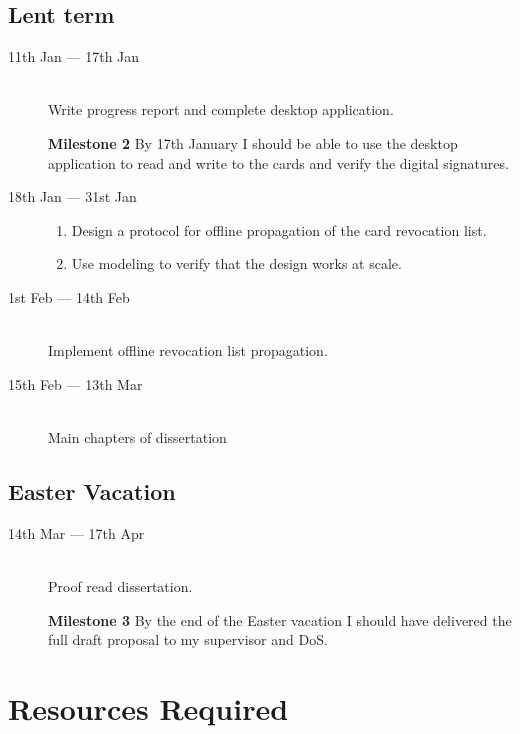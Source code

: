 \documentclass[a4paper, 12pt]{article}
\begin{document}
  \subsection*{Lent term}
  \begin{description}
    \item[11th Jan --- 17th Jan] \hfill \\
      Write progress report and complete desktop application.


      \textbf{Milestone 2}
      By 17th January I should be able to use the desktop application to read
      and write to the cards and verify the digital signatures.

    \item[18th Jan --- 31st Jan] \hfill
      \begin{enumerate}
        \item Design a protocol for offline propagation of the card revocation
          list.
        \item Use modeling to verify that the design works at scale.
      \end{enumerate}

    \item[1st Feb --- 14th Feb] \hfill \\
      Implement offline revocation list propagation.

    \item[15th Feb --- 13th Mar] \hfill \\
      Main chapters of dissertation

  \end{description}

  \subsection*{Easter Vacation}
  \begin{description}
    \item[14th Mar --- 17th Apr] \hfill \\
      Proof read dissertation.

      \textbf{Milestone 3}
      By the end of the Easter vacation I should have delivered the full draft
      proposal to my supervisor and DoS.
  \end{description}


  \section*{Resources Required}
\end{document}
